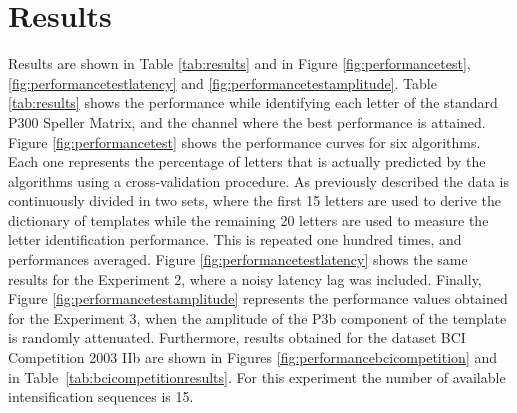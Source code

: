 \documentclass[brainsci,article,submit,moreauthors,pdftex,10pt,a4paper]{mdpi}
\begin{document}
\section{Results}
\label{section:results}

Results are shown in Table \ref{tab:results} and in Figure \ref{fig:performancetest},\ref{fig:performancetestlatency} and \ref{fig:performancetestamplitude}.  Table \ref{tab:results} shows the  performance while identifying each letter of the standard P300 Speller Matrix, and the channel where the best performance is attained.   Figure \ref{fig:performancetest} shows the performance curves for six algorithms.  Each one represents the percentage of letters that is actually predicted by the algorithms using a cross-validation procedure.  As previously described the data is continuously divided in two sets, where the first 15 letters are used to derive the dictionary of templates while the remaining 20 letters are used to measure the letter identification performance. This is repeated one hundred times, and performances averaged.   Figure \ref{fig:performancetestlatency} shows the same results for the Experiment 2, where a noisy latency lag was included.   Finally, Figure \ref{fig:performancetestamplitude} represents the performance values obtained for the Experiment 3, when the amplitude of the P3b component of the template is randomly attenuated.  Furthermore, results obtained for the dataset BCI Competition 2003 IIb are shown in Figures \ref{fig:performancebcicompetition} and in Table~\ref{tab:bcicompetitionresults}.  For this experiment the number of available intensification sequences is 15.
\end{document}
